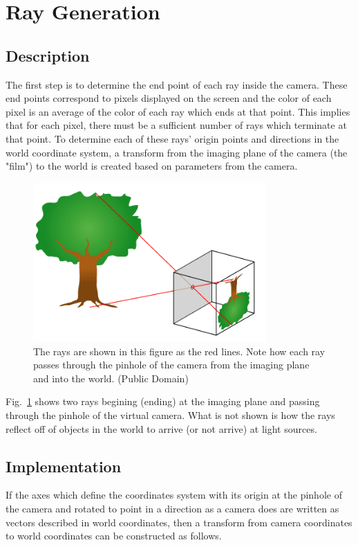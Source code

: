 \documentclass{article}
\begin{document}
\section{Ray Generation}
\subsection{Description}
The first step is to determine the end point of each ray inside the camera. These end points correspond to 
pixels displayed on the screen and the color of each pixel is an average of the color of each ray which ends
at that point. This implies that for each pixel, there must be a sufficient number of rays which terminate
at that point. To determine each of these rays' origin points and directions in the world coordinate system,
a transform from the imaging plane of the camera (the "film") to the world is created based on parameters from the camera.

\begin{figure}[!t]
\centering
\includegraphics[width=3.5in]{./imgs/Pinhole-camera}
\caption{The rays are shown in this figure as the red lines. Note how each ray passes through the pinhole
of the camera from the imaging plane and into the world. (Public Domain)}
\label{fig:pinhole}
\end{figure}

Fig.~\ref{fig:pinhole} shows two rays begining (ending) at the imaging plane and passing through the pinhole
of the virtual camera. What is not shown is how the rays reflect off of objects in the world to arrive
 (or not arrive) at light sources.

\subsection{Implementation}
If the axes which define the coordinates system with its origin at the pinhole of the camera and rotated 
to point in a direction as a camera does are written as vectors described in world coordinates, then a 
transform from camera coordinates to world coordinates can be constructed as follows.
\end{document}
